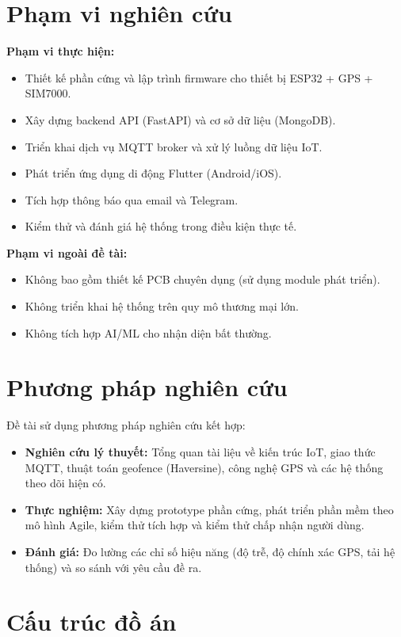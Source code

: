 \section{Phạm vi nghiên cứu}

\textbf{Phạm vi thực hiện:}
\begin{itemize}[noitemsep]
  \item Thiết kế phần cứng và lập trình firmware cho thiết bị ESP32 + GPS + SIM7000.
  \item Xây dựng backend API (FastAPI) và cơ sở dữ liệu (MongoDB).
  \item Triển khai dịch vụ MQTT broker và xử lý luồng dữ liệu IoT.
  \item Phát triển ứng dụng di động Flutter (Android/iOS).
  \item Tích hợp thông báo qua email và Telegram.
  \item Kiểm thử và đánh giá hệ thống trong điều kiện thực tế.
\end{itemize}

\textbf{Phạm vi ngoài đề tài:}
\begin{itemize}[noitemsep]
  \item Không bao gồm thiết kế PCB chuyên dụng (sử dụng module phát triển).
  \item Không triển khai hệ thống trên quy mô thương mại lớn.
  \item Không tích hợp AI/ML cho nhận diện bất thường.
\end{itemize}

\section{Phương pháp nghiên cứu}

Đề tài sử dụng phương pháp nghiên cứu kết hợp:
\begin{itemize}
  \item \textbf{Nghiên cứu lý thuyết:} Tổng quan tài liệu về kiến trúc IoT, giao thức MQTT, thuật toán geofence (Haversine), công nghệ GPS và các hệ thống theo dõi hiện có.
  \item \textbf{Thực nghiệm:} Xây dựng prototype phần cứng, phát triển phần mềm theo mô hình Agile, kiểm thử tích hợp và kiểm thử chấp nhận người dùng.
  \item \textbf{Đánh giá:} Đo lường các chỉ số hiệu năng (độ trễ, độ chính xác GPS, tải hệ thống) và so sánh với yêu cầu đề ra.
\end{itemize}

\section{Cấu trúc đồ án}

